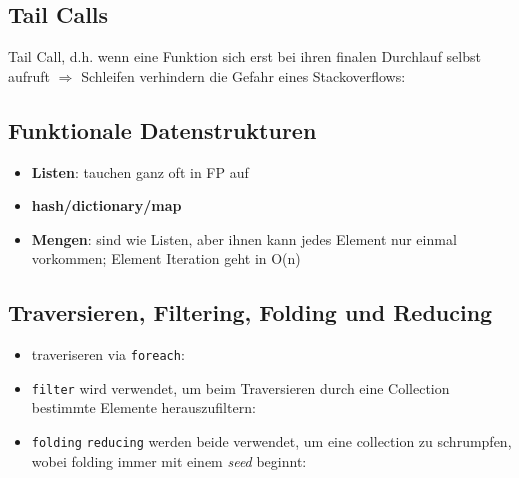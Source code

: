 \subsection{Tail Calls}
Tail Call, d.h. wenn eine Funktion sich erst bei ihren
finalen Durchlauf selbst aufruft $\Rightarrow$ Schleifen verhindern die
Gefahr eines Stackoverflows:

  


\subsection{Funktionale Datenstrukturen}
\begin{itemize}
  \item \textbf{Listen}: tauchen ganz oft in FP auf
  
  
  
  \item \textbf{hash/dictionary/map}
    
  \item \textbf{Mengen}: sind wie Listen, aber ihnen kann jedes
  Element nur einmal vorkommen; Element Iteration geht in O(n)
\end{itemize}


\subsection{Traversieren, Filtering, Folding und Reducing}
\begin{itemize}
  \item traveriseren via \texttt{foreach}:
  
  
    
  \item \texttt{filter} wird verwendet, um beim Traversieren durch eine
  Collection bestimmte Elemente herauszufiltern:
  
  
  
  \item \texttt{folding} \und \texttt{reducing} werden beide verwendet, um
  eine collection zu schrumpfen, wobei folding immer mit einem 
  \textit{seed} beginnt:
  
    
\end{itemize}


